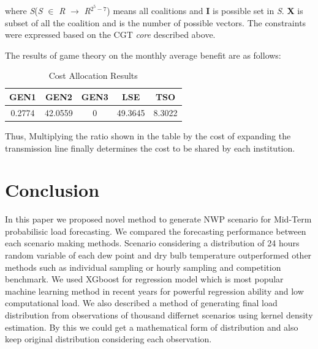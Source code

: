 \documentclass[journal]{IEEEtran} %
\begin{document}
where \textit{S}(\textit{S} $\in$ \textit{R} $\rightarrow$ \textit{R}$^{2^{5}-7}$) means all coalitions and \textbf{I} is possible set in \textit{S}. \textbf{X} is subset of all the coalition and is the number of possible vectors. The constraints were expressed based on the CGT \textit{core} described above.

The results of game theory on the monthly average benefit are as follows:

\begin{table}[h!]
\caption{Cost Allocation Results}
\centering
\begin{tabular}{|c c c c c|}
\hline
GEN1 & GEN2 & GEN3 & LSE & TSO\\[0.5ex]
\hline
0.2774 & 42.0559 & 0 & 49.3645 & 8.3022\\
\hline
\end{tabular}
\end{table}

Thus, Multiplying the ratio shown in the table by the cost of expanding the transmission line finally determines the cost to be shared by each institution.

\section{Conclusion}
  In this paper we proposed novel method to generate NWP scenario for Mid-Term probabilisic load forecasting. We compared the forecasting performance between each scenario making methods. Scenario considering a distribution of 24 hours random variable of each dew point and dry bulb temperature outperformed other methods such as individual sampling or hourly sampling and competition benchmark.
   {We used XGboost for regression model which is most popular machine learning method in recent years for powerful regression ability and low computational load. We also described a method of generating final load distribution from observations of thousand differnet scenarios using kernel density estimation. By this we could get a mathematical form of distribution and also keep original distribution considering each observation.}        





\ifCLASSOPTIONcaptionsoff
  \newpage
\fi




\end{document}
